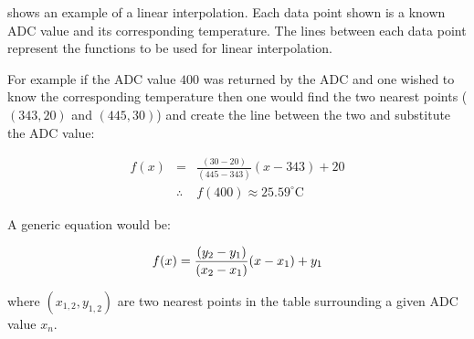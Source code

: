 \documentclass[main.tex]{subfiles}
\begin{document}
		 shows an example of a linear interpolation. Each data
		point shown is a known ADC value and its corresponding temperature. The
		lines between each data point represent the functions to be used for linear
		interpolation.
		
		For example if the ADC value $400$ was returned by the ADC and one wished to
		know the corresponding temperature then one would find the two nearest
		points ($(343,20)$ and $(445,30)$) and create the line between the two
		and substitute the ADC value:

		\begin{eqnarray*}
			f(x) & = & \frac{(30-20)}{(445-343)}(x-343)+20 \\
			& \therefore & f(400) \approx 25.59^{\circ}\mathrm{C}
		\end{eqnarray*}

		A generic equation would be:

		\[
			f(x) = \frac{(y_{2}-y_{1})}{(x_{2}-x_{1})}(x-x_{1})+y_{1}\\
		\]

		where $(x_{1,2},y_{1,2})$ are two nearest points in the table surrounding a
		given ADC value $x_{n}$. 
\end{document}
